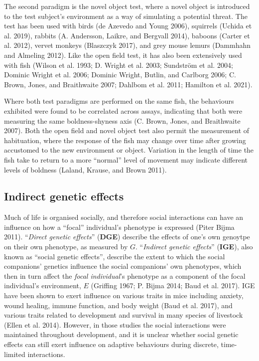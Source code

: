 \documentclass[
]{book}
\begin{document}
The second paradigm is the novel object test, where a novel object is introduced to the test subject's environment as a way of simulating a potential threat. The test has been used with birds (de Azevedo and Young 2006), squirrels (Uchida et al. 2019), rabbits (A. Andersson, Laikre, and Bergvall 2014), baboons (Carter et al. 2012), vervet monkeys (Blaszczyk 2017), and grey mouse lemurs (Dammhahn and Almeling 2012). Like the open field test, it has also been extensively used with fish (Wilson et al. 1993; D. Wright et al. 2003; Sundström et al. 2004; Dominic Wright et al. 2006; Dominic Wright, Butlin, and Carlborg 2006; C. Brown, Jones, and Braithwaite 2007; Dahlbom et al. 2011; Hamilton et al. 2021).

Where both test paradigms are performed on the same fish, the behaviours exhibited were found to be correlated across assays, indicating that both were measuring the same boldness-shyness axis (C. Brown, Jones, and Braithwaite 2007). Both the open field and novel object test also permit the measurement of habituation, where the response of the fish may change over time after growing accustomed to the new environment or object. Variation in the length of time the fish take to return to a more ``normal'' level of movement may indicate different levels of boldness (Laland, Krause, and Brown 2011).

\hypertarget{SGE}{%
\subsection{Indirect genetic effects}\label{SGE}}

Much of life is organised socially, and therefore social interactions can have an influence on how a ``focal'' individual's phenotype is expressed (Piter Bijma 2011). ``\emph{Direct genetic effects}'' (\textbf{DGE}) describe the effects of one's own genoytpe on their own phenotype, as measured by \(G\). ``\emph{Indirect genetic effects}'' (\textbf{IGE}), also known as ``social genetic effects'', describe the extent to which the social companions' genetics influence the social companions' own phenotypes, which then in turn affect the \emph{focal individual}'s phenotype as a component of the focal individual's environment, \(E\) (Griffing 1967; P. Bijma 2014; Baud et al. 2017). IGE have been shown to exert influence on various traits in mice including anxiety, wound healing, immune function, and body weight (Baud et al. 2017), and various traits related to development and survival in many species of livestock (Ellen et al. 2014). However, in those studies the social interactions were maintained throughout development, and it is unclear whether social genetic effects can still exert influence on adaptive behaviours during discrete, time-limited interactions.
\end{document}
